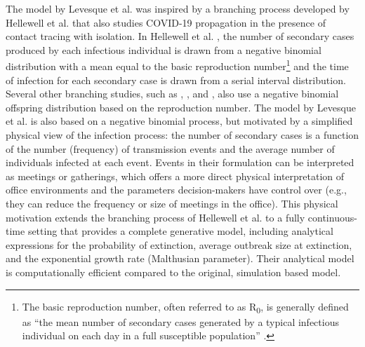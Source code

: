 \documentclass[sr]{drdc-report}
\begin{document}

 

The model by Levesque et al. was inspired by a branching process developed by Hellewell et al. \cite{Hellewell} that also studies COVID-19 propagation in the presence of contact tracing with isolation. In Hellewell et al. \cite{Hellewell}, the number of secondary cases produced by each infectious individual is drawn from a negative binomial distribution with a mean equal to the basic reproduction number{\footnote{The basic reproduction number, often referred to as R\textsubscript{0}, is generally defined as “the mean number of secondary cases generated by a typical infectious individual on each day in a full susceptible population” \cite{Kucharski}.}} and the time of infection for each secondary case is drawn from a serial interval{\footnotemark} distribution. Several other branching studies, such as \cite{Boldog}, \cite{Kucharski}, \cite{Pearson} and \cite{Endo}, also use a negative binomial offspring distribution based on the reproduction number. The model by Levesque et al. is also based on a negative binomial process, but motivated by a simplified physical view of the infection process: the number of secondary cases is a function of the number (frequency) of transmission events and the average number of individuals infected at each event. Events in their formulation can be interpreted as meetings or gatherings, which offers a more direct physical interpretation of office environments and the parameters decision-makers have control over (e.g., they can reduce the frequency or size of meetings in the office). This physical motivation extends the branching process of Hellewell et al. to a fully continuous-time setting that provides a complete generative model, including analytical expressions for the probability of extinction, average outbreak size at extinction, and the exponential growth rate (Malthusian parameter). Their analytical model is computationally efficient compared to the original, simulation based model.  


\end{document}
